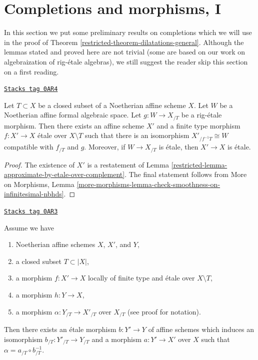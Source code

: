 \section{Completions and morphisms, I}
\label{restricted-section-completion-and-morphisms}
In this section we put some preliminary results on completions
which we will use in the proof of Theorem \ref{restricted-theorem-dilatations-general}.
Although the lemmas stated and proved here are not trivial
(some are based on our work on algebraization of rig-\'etale algebras),
we still suggest the reader skip this section on a first reading.

\begin{lemma}
\label{restricted-lemma-algebraize-rig-etale-affine}
\href{https://stacks.math.columbia.edu/tag/0AR4}{\texttt{Stacks tag 0AR4}}

Let $T \subset X$ be a closed subset of a Noetherian affine scheme $X$.
Let $W$ be a Noetherian affine formal algebraic space.
Let $g : W \to X_{/T}$ be a rig-\'etale morphism. Then there exists
an affine scheme $X'$ and a finite type morphism $f : X' \to X$
\'etale over $X \setminus T$ such that there is an isomorphism
$X'_{/f^{-1}T} \cong W$ compatible with $f_{/T}$ and $g$.
Moreover, if $W \to X_{/T}$ is \'etale, then $X' \to X$ is \'etale.
\end{lemma}

\begin{proof}

The existence of $X'$ is a restatement of
Lemma \ref{restricted-lemma-approximate-by-etale-over-complement}.
The final statement follows from
More on Morphisms, Lemma
\ref{more-morphisms-lemma-check-smoothness-on-infinitesimal-nbhds}.
\end{proof}

\begin{lemma}
\label{restricted-lemma-algebraize-morphism-rig-etale}
\href{https://stacks.math.columbia.edu/tag/0AR3}{\texttt{Stacks tag 0AR3}}

Assume we have
\begin{enumerate}
\item Noetherian affine schemes $X$, $X'$, and $Y$,
\item a closed subset $T \subset |X|$,
\item a morphism $f : X' \to X$ locally of finite type
and \'etale over $X \setminus T$,
\item a morphism $h : Y \to X$,
\item a morphism $\alpha : Y_{/T} \to X'_{/T}$ over $X_{/T}$
(see proof for notation).
\end{enumerate}
Then there exists an \'etale morphism $b : Y' \to Y$ of affine schemes
which induces an isomorphism $b_{/T} : Y'_{/T} \to Y_{/T}$
and a morphism $a : Y' \to X'$ over $X$
such that $\alpha = a_{/T} \circ b_{/T}^{-1}$.
\end{lemma}

